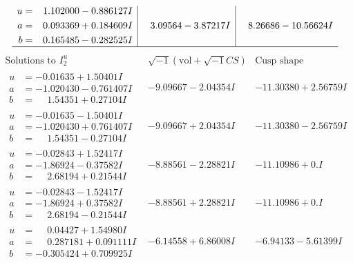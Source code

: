 \documentclass[1p]{elsarticle_modified}
\theoremstyle{definition}
\newcommand{\I}{\sqrt{-1}}
\begin{document}
$$\begin{array}{c|c|c}
\begin{aligned}
u &= \phantom{-}1.102000 - 0.886127 I \\
a &= \phantom{-}0.093369 + 0.184609 I \\
b &= \phantom{-}0.165485 - 0.282525 I\end{aligned}
 & \phantom{-}3.09564 - 3.87217 I & \phantom{-}8.26686 - 10.56624 I\\
 \hline 
 \end{array}$$\newpage$$\begin{array}{c|c|c}  
\text{Solutions to }I^u_{2}& \I (\text{vol} + \sqrt{-1}CS) & \text{Cusp shape}\\
 \hline 
\begin{aligned}
u &= -0.01635 + 1.50401 I \\
a &= -1.020430 - 0.761407 I \\
b &= \phantom{-}1.54351 + 0.27104 I\end{aligned}
 & -9.09667 - 2.04354 I & -11.30380 + 2.56759 I \\ \hline\begin{aligned}
u &= -0.01635 - 1.50401 I \\
a &= -1.020430 + 0.761407 I \\
b &= \phantom{-}1.54351 - 0.27104 I\end{aligned}
 & -9.09667 + 2.04354 I & -11.30380 - 2.56759 I \\ \hline\begin{aligned}
u &= -0.02843 + 1.52417 I \\
a &= -1.86924 - 0.37582 I \\
b &= \phantom{-}2.68194 + 0.21544 I\end{aligned}
 & -8.88561 - 2.28821 I & -11.10986 + 0. I\phantom{ +0.000000I} \\ \hline\begin{aligned}
u &= -0.02843 - 1.52417 I \\
a &= -1.86924 + 0.37582 I \\
b &= \phantom{-}2.68194 - 0.21544 I\end{aligned}
 & -8.88561 + 2.28821 I & -11.10986 + 0. I\phantom{ +0.000000I} \\ \hline\begin{aligned}
u &= \phantom{-}0.04427 + 1.54980 I \\
a &= \phantom{-}0.287181 + 0.091111 I \\
b &= -0.305424 + 0.709925 I\end{aligned}
 & -6.14558 + 6.86008 I & -6.94133 - 5.61399 I \\ \hline\begin{aligned}

\end{aligned}
\end{array}$$
\end{document}
